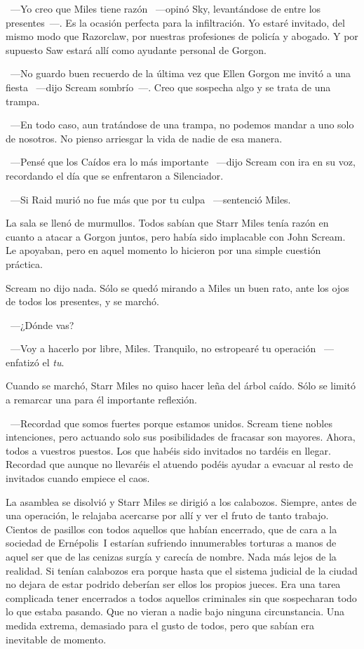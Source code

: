~---Yo creo que Miles tiene razón ~---opinó Sky, levantándose de entre los presentes~---. Es la ocasión perfecta para la infiltración. Yo estaré invitado, del mismo modo que Razorclaw, por nuestras profesiones de policía y abogado. Y por supuesto Saw estará allí como ayudante personal de Gorgon.

~---No guardo buen recuerdo de la última vez que Ellen Gorgon me invitó a una fiesta ~---dijo Scream sombrío~---. Creo que sospecha algo y se trata de una trampa.

~---En todo caso, aun tratándose de una trampa, no podemos mandar a uno solo de nosotros. No pienso arriesgar la vida de nadie de esa manera.

~---Pensé que los Caídos era lo más importante ~---dijo Scream con ira en su voz, recordando el día que se enfrentaron a Silenciador.

~---Si Raid murió no fue más que por tu culpa ~---sentenció Miles.

La sala se llenó de murmullos. Todos sabían que Starr Miles tenía razón en cuanto a atacar a Gorgon juntos, pero había sido implacable con John Scream. Le apoyaban, pero en aquel momento lo hicieron por una simple cuestión práctica.

Scream no dijo nada. Sólo se quedó mirando a Miles un buen rato, ante los ojos de todos los presentes, y se marchó.

~---¿Dónde vas?

~---Voy a hacerlo por libre, Miles. Tranquilo, no estropearé tu operación ~---enfatizó el \emph{tu}.

Cuando se marchó, Starr Miles no quiso hacer leña del árbol caído. Sólo se limitó a remarcar una para él importante reflexión.

~---Recordad que somos fuertes porque estamos unidos. Scream tiene nobles intenciones, pero actuando solo sus posibilidades de fracasar son mayores. Ahora, todos a vuestros puestos. Los que habéis sido invitados no tardéis en llegar. Recordad que aunque no llevaréis el atuendo podéis ayudar a evacuar al resto de invitados cuando empiece el caos.

La asamblea se disolvió y Starr Miles se dirigió a los calabozos. Siempre, antes de una operación, le relajaba acercarse por allí y ver el fruto de tanto trabajo. Cientos de pasillos con todos aquellos que habían encerrado, que de cara a la sociedad de Ernépolis~I estarían sufriendo innumerables torturas a manos de aquel ser que de las cenizas surgía y carecía de nombre. Nada más lejos de la realidad. Si tenían calabozos era porque hasta que el sistema judicial de la ciudad no dejara de estar podrido deberían ser ellos los propios jueces. Era una tarea complicada tener encerrados a todos aquellos criminales sin que sospecharan todo lo que estaba pasando. Que no vieran a nadie bajo ninguna circunstancia. Una medida extrema, demasiado para el gusto de todos, pero que sabían era inevitable de momento.

